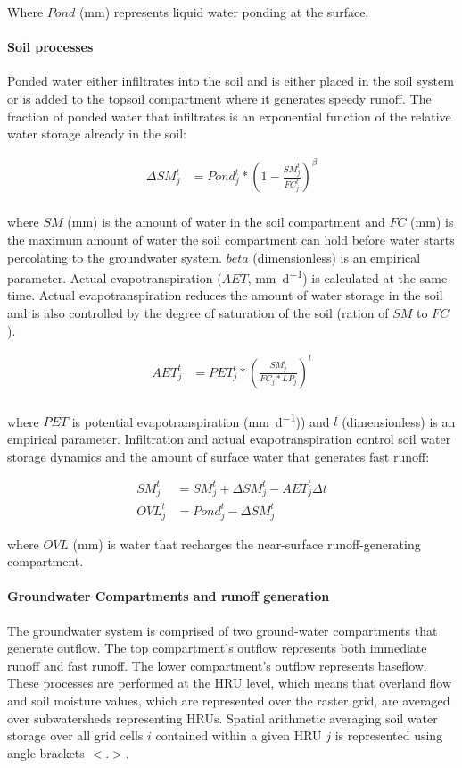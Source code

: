 \noindent Where $Pond$ (\si{\milli\metre}) represents liquid water ponding at the surface.

\paragraph{Soil processes} 

Ponded water either infiltrates into the soil and is either placed in the soil system or is added to the topsoil compartment where it generates speedy runoff. The fraction of ponded water that infiltrates is an exponential function of the relative water storage already in the soil:

\begin{align}
\Delta SM_j^t &= Pond_j^t * \left(1 - \frac{SM_j^t}{FC_j^t} \right)^\beta \\
\end{align}

\noindent where $SM$ (\si{\milli\metre}) is the amount of water in the soil compartment and $FC$ (\si{\milli\metre}) is the maximum amount of water the soil compartment can hold before water starts percolating to the groundwater system. $beta$ (dimensionless) is an empirical parameter. Actual evapotranspiration ($AET$, \si{\milli\metre\per\day}) is calculated at the same time. Actual evapotranspiration reduces the amount of water storage in the soil and is also controlled by the degree of saturation of the soil (ration of $SM$ to $FC$).

\begin{align}
AET_j^t &= PET_j^t * \left(\frac{SM_j^t}{FC_j * LP_j} \right)^l  \\
\end{align}

\noindent where $PET$ is potential evapotranspiration (\si{\milli\metre\per\day})) and $l$ (dimensionless) is an empirical  parameter. Infiltration and actual evapotranspiration control soil water storage dynamics and the amount of surface water that generates fast runoff:

\begin{align}
SM_j^t &= SM_j^{t} + \Delta SM_j^t - AET_j^t \Delta t\\
OVL_j^t &= Pond_j^t - \Delta SM_j^t
\end{align}

\noindent where $OVL$ (\si{\milli\metre}) is water that recharges the near-surface runoff-generating compartment.

\paragraph{Groundwater Compartments and runoff generation}
The groundwater system is comprised of two ground-water compartments that generate outflow. The top compartment's outflow represents both immediate runoff and fast runoff. The lower compartment's outflow represents baseflow. These processes are performed at the HRU level, which means that overland flow and soil moisture values, which are represented over the raster grid, are averaged over subwatersheds representing HRUs. Spatial arithmetic averaging soil water storage over all grid cells $i$ contained within a given HRU $j$ is represented using angle brackets $<.>$. 


